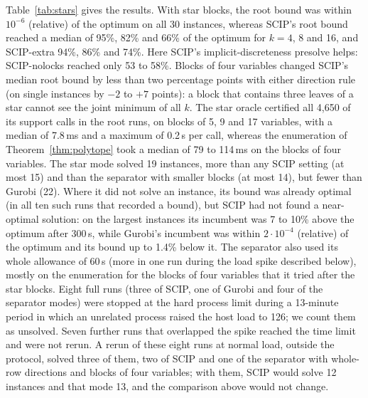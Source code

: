 Table~\ref{tab:stars} gives the results. With star blocks, the root bound was
within $10^{-6}$ (relative) of the optimum on all 30 instances, whereas SCIP's
root bound reached a median of 95\%, 82\% and 66\% of the optimum for $k=4$, 8
and 16, and SCIP-extra 94\%, 86\% and 74\%. Here SCIP's implicit-discreteness
presolve helps: SCIP-nolocks reached only 53 to 58\%. Blocks of four variables
changed SCIP's median root bound by less than two percentage points with either
direction rule (on single instances by $-2$ to $+7$ points): a block that contains three leaves of a star cannot see
the joint minimum of all $k$. The star oracle certified all 4{,}650 of its
support calls in the root runs, on blocks of 5, 9 and 17 variables, with a
median of 7.8\,ms and a maximum of 0.2\,s per call, whereas the enumeration of
Theorem~\ref{thm:polytope} took a median of 79 to 114\,ms on the blocks of four
variables. The star mode solved 19 instances, more than any SCIP setting (at
most 15) and than the separator with smaller blocks (at most 14), but fewer
than Gurobi (22). Where it did not solve an instance, its bound was already
optimal (in all ten such runs that recorded a bound), but SCIP had not found a near-optimal solution: on the largest
instances its incumbent was 7 to 10\% above the optimum after 300\,s, while
Gurobi's incumbent was within $2\cdot10^{-4}$ (relative) of the optimum and its
bound up to 1.4\% below it. The separator also used its whole allowance of
60\,s (more in one run during the load spike described below), mostly on the
enumeration for the blocks of four variables that it tried after the star
blocks. Eight full runs
(three of SCIP, one of Gurobi and four of the separator modes) were stopped at
the hard process limit during a 13-minute period in which an unrelated process
raised the host load to 126; we count them as unsolved. Seven further runs that
overlapped the spike reached the time limit and were not rerun. A rerun of these eight
runs at normal load, outside the protocol, solved three of them, two of SCIP and
one of the separator with whole-row directions and blocks of four variables;
with them, SCIP would solve 12 instances and that mode 13, and the comparison
above would not change.

